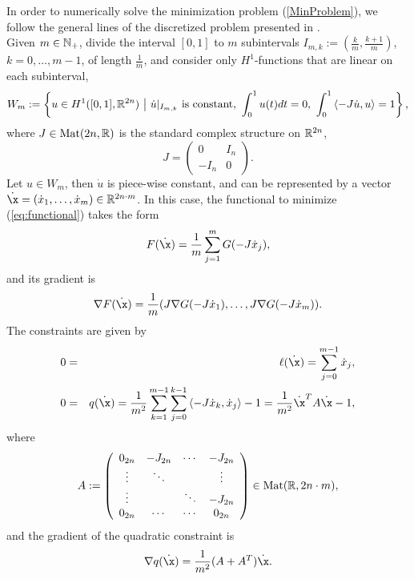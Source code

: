 \documentclass[../capacities_main.tex]{subfiles}
\begin{document}
	
	
	In order to numerically solve the minimization problem (\ref{MinProblem}), we follow the general lines of the discretized problem presented in \cite{gjthesis}. \\

	
	Given $m\in{\mathbb N}_+$, divide the interval $[0,1]$ to $m$ subintervals $I_{m,k}:=(\frac{k}{m},\frac{k+1}{m})$, $k=0,\dots,m-1$, of length $\frac{1}{m}$, and consider only $H^1$-functions that are linear on each subinterval,
	\begin{equation}
	W_m:=\left\{u\in H^1([0,1],\R^{2n})\ \big|\ \dot u|_{I_{m,k}} \text{ is constant},\ \int_0^1u(t)dt=0,\ \int_0^1\left<-J\dot u,u\right>=1 \right\},
	\end{equation}
	where $J\in\operatorname{Mat}(2n,{\mathbb R})$ is the standard complex structure on ${\mathbb R}^{2n}$,
	\begin{equation*}
	J= \left(\begin{array}{cc}
	0 & I_n\\ -I_n & 0
	\end{array}\right).
	\end{equation*}
	Let $u\in W_m$, then $\dot u$ is piece-wise constant, and can be represented by a vector $\dot \x= (\dot x_1,\dots,\dot x_{m})\in \R^{2n\cdot m}$. In this case, the functional to minimize (\ref{eq:functional}) takes the form
	\begin{equation}
	F(\dot\x) = \frac{1}{m} \sum_{j=1}^{m} G(-J \dot x_j),
	\end{equation}
	and its gradient is
	\begin{equation}
	\nabla F (\dot\x) = \frac{1}{m} (J\nabla G(-J\dot x_1),\dots,J\nabla G(-J\dot x_{m})).
	\end{equation}
	The constraints are given by
	\begin{eqnarray}
	0 &=& \ell(\dot\x) = \sum_{j=0}^{m-1}\dot x_j, \label{eq:lincon}\\
	0 &=& q(\dot\x) = \frac{1}{m^2} \sum_{k=1}^{m-1}\sum_{j=0}^{k-1}\left<-J \dot x_k, \dot x_j\right> -1 = \frac{1}{m^2} \dot \x^T A \dot \x -1,\label{eq:quadcon}
	\end{eqnarray}
	where 
	\begin{equation*}
	A:=\left(\begin{array}{cccc}
	0_{2n} & -J_{2n} & \cdots & -J_{2n}\\
	\vdots & \ddots & & \vdots\\
	\vdots & & \ddots & -J_{2n}\\
	0_{2n} & \cdots & \cdots & 0_{2n}
	\end{array}\right) \in \operatorname{Mat}({\mathbb R}, 2n\cdot m),
	\end{equation*}
	and the gradient of the quadratic constraint is 
	\begin{equation*}
	\nabla q(\dot\x) = \frac{1}{m^2} (A+A^T)\dot \x.
	\end{equation*}
	
\end{document}

